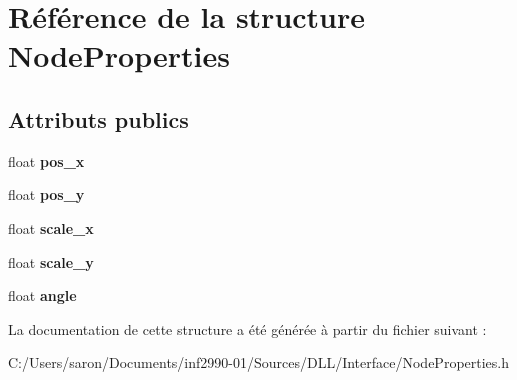 \hypertarget{struct_node_properties}{\section{Référence de la structure Node\-Properties}
\label{struct_node_properties}
}
\subsection*{Attributs publics}
\begin{DoxyCompactItemize}
\item 
\hypertarget{struct_node_properties_a5c3926e71b48fc207c660879d3605b9c}{float {\bfseries pos\-\_\-x}}\label{struct_node_properties_a5c3926e71b48fc207c660879d3605b9c}

\item 
\hypertarget{struct_node_properties_ac367066fcf3484c36f71b9f8907207bc}{float {\bfseries pos\-\_\-y}}\label{struct_node_properties_ac367066fcf3484c36f71b9f8907207bc}

\item 
\hypertarget{struct_node_properties_a49637b6297462ecd714bf0cdf9584381}{float {\bfseries scale\-\_\-x}}\label{struct_node_properties_a49637b6297462ecd714bf0cdf9584381}

\item 
\hypertarget{struct_node_properties_a0efed2f7fd0a28c6a3a58bbf5e771d53}{float {\bfseries scale\-\_\-y}}\label{struct_node_properties_a0efed2f7fd0a28c6a3a58bbf5e771d53}

\item 
\hypertarget{struct_node_properties_a512b63456ff635298229e9b6207566ac}{float {\bfseries angle}}\label{struct_node_properties_a512b63456ff635298229e9b6207566ac}

\end{DoxyCompactItemize}


La documentation de cette structure a été générée à partir du fichier suivant \-:\begin{DoxyCompactItemize}
\item 
C\-:/\-Users/saron/\-Documents/inf2990-\/01/\-Sources/\-D\-L\-L/\-Interface/Node\-Properties.\-h\end{DoxyCompactItemize}
